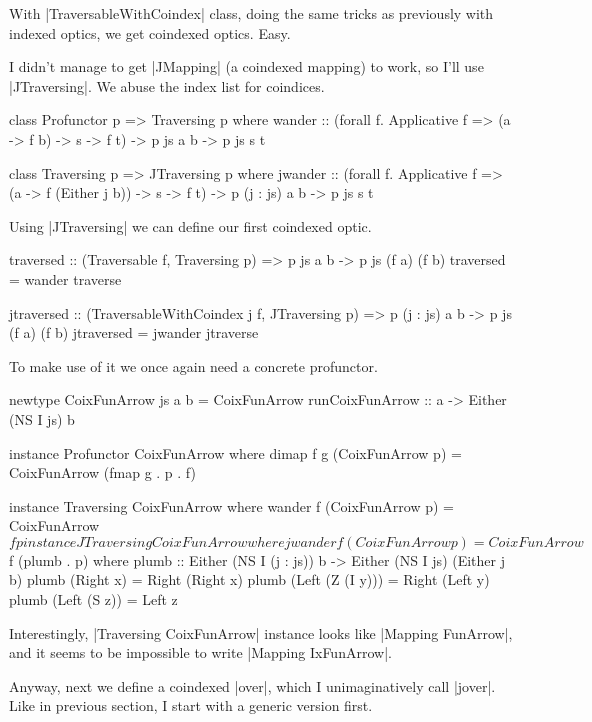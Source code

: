 With |TraversableWithCoindex| class, doing the same tricks as previously
with indexed optics, we get coindexed optics. Easy.

I didn't manage to get |JMapping| (a coindexed mapping) to work,
so I'll use |JTraversing|.
We abuse the index list for coindices.

\begin{code}
class Profunctor p => Traversing p where
    wander :: (forall f. Applicative f => (a -> f b) -> s -> f t)
           -> p js a b -> p js s t

class Traversing p => JTraversing p where
    jwander
        :: (forall f. Applicative f => (a -> f (Either j b)) -> s -> f t)
        -> p (j : js) a b -> p js s t
\end{code}

Using |JTraversing| we can define our first coindexed optic.

\begin{code}
traversed :: (Traversable f, Traversing p) => p js a b -> p js (f a) (f b)
traversed = wander traverse

jtraversed :: (TraversableWithCoindex j f, JTraversing p)
           => p (j : js) a b -> p js (f a) (f b)
jtraversed = jwander jtraverse
\end{code}

To make use of it we once again need a concrete profunctor.

\begin{code}
newtype CoixFunArrow js a b = CoixFunArrow
    { runCoixFunArrow :: a -> Either (NS I js) b }

instance Profunctor CoixFunArrow where
    dimap f g (CoixFunArrow p) = CoixFunArrow (fmap g . p . f)

instance Traversing CoixFunArrow where
    wander f (CoixFunArrow p) = CoixFunArrow $ f p

instance JTraversing CoixFunArrow where
    jwander f (CoixFunArrow p) = CoixFunArrow $ f (plumb . p) where
        plumb :: Either (NS I (j : js)) b -> Either (NS I js) (Either j b)
        plumb (Right x)        = Right (Right x)
        plumb (Left (Z (I y))) = Right (Left y)
        plumb (Left (S z))     = Left z
\end{code}

Interestingly, |Traversing CoixFunArrow| instance looks like
|Mapping FunArrow|, and it seems to be impossible to write |Mapping IxFunArrow|.

Anyway, next we define a coindexed |over|, which I unimaginatively call |jover|.
Like in previous section, I start with a generic version first.

